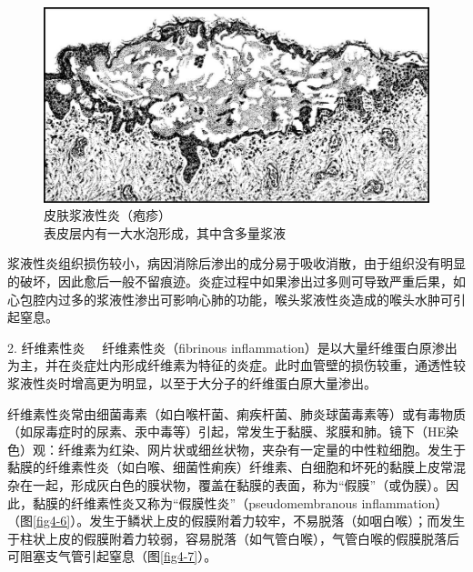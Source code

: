 \begin{figure}[!htbp]
 \centering
 \includegraphics{./images/Image00056.jpg}
 \caption{皮肤浆液性炎（疱疹）\\ {\small 表皮层内有一大水泡形成，其中含多量浆液}}
 \label{fig4-5}
  \end{figure} 

浆液性炎组织损伤较小，病因消除后渗出的成分易于吸收消散，由于组织没有明显的破坏，因此愈后一般不留痕迹。炎症过程中如果渗出过多则可导致严重后果，如心包腔内过多的浆液性渗出可影响心肺的功能，喉头浆液性炎造成的喉头水肿可引起窒息。

{2. 纤维素性炎} 　纤维素性炎（fibrinous
inflammation）是以大量纤维蛋白原渗出为主，并在炎症灶内形成纤维素为特征的炎症。此时血管壁的损伤较重，通透性较浆液性炎时增高更为明显，以至于大分子的纤维蛋白原大量渗出。

纤维素性炎常由细菌毒素（如白喉杆菌、痢疾杆菌、肺炎球菌毒素等）或有毒物质（如尿毒症时的尿素、汞中毒等）引起，常发生于黏膜、浆膜和肺。镜下（HE染色）观：纤维素为红染、网片状或细丝状物，夹杂有一定量的中性粒细胞。发生于黏膜的纤维素性炎（如白喉、细菌性痢疾）纤维素、白细胞和坏死的黏膜上皮常混杂在一起，形成灰白色的膜状物，覆盖在黏膜的表面，称为``假膜''（或伪膜）。因此，黏膜的纤维素性炎又称为``假膜性炎''（pseudomembranous
inflammation）（图\ref{fig4-6}）。发生于鳞状上皮的假膜附着力较牢，不易脱落（如咽白喉）；而发生于柱状上皮的假膜附着力较弱，容易脱落（如气管白喉），气管白喉的假膜脱落后可阻塞支气管引起窒息（图\ref{fig4-7}）。

